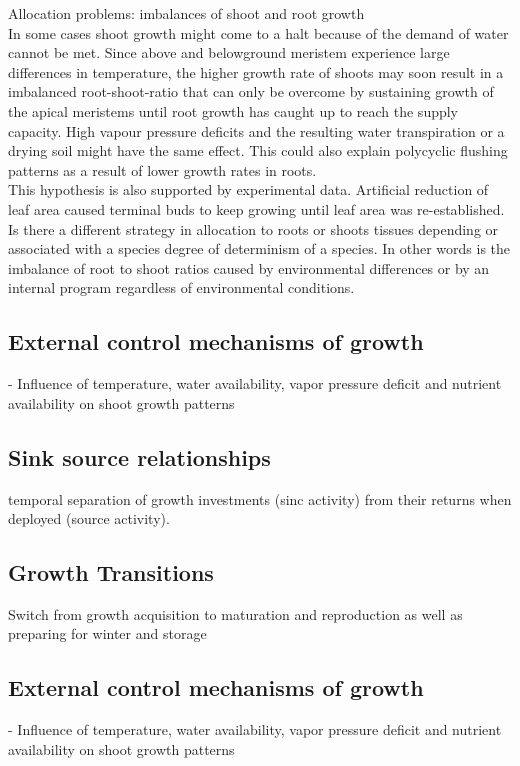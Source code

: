 \documentclass{article}
\begin{document}
Allocation problems: imbalances of shoot and root growth\\
In some cases shoot growth might come to a halt because of the demand of water cannot be met. Since above and belowground meristem experience large differences in temperature, the higher growth rate of shoots may soon result in a imbalanced root-shoot-ratio that can only be overcome by sustaining growth of the apical meristems until root growth has caught up to reach the supply capacity. High vapour pressure deficits and the resulting water transpiration or a drying soil might have the same effect. This could also explain polycyclic flushing patterns as a result of lower growth rates in roots.\\
This hypothesis is also supported by experimental data. Artificial reduction of leaf area caused terminal buds to keep growing until leaf area was re-established.
Is there a different strategy in allocation to roots or shoots tissues depending or associated with a species degree of determinism of a species. In other words is the imbalance of root to shoot ratios caused by environmental differences or by an internal program regardless of environmental conditions. \\


\subsection*{External control mechanisms of growth}
- Influence of temperature, water availability, vapor pressure deficit and nutrient availability on shoot growth patterns\\

\subsection*{Sink source relationships}
temporal separation of growth investments (sinc activity) from their returns when deployed (source activity). \\

\subsection*{Growth Transitions}
Switch from growth acquisition to maturation and reproduction as well as preparing for winter and storage\\


\subsection*{External control mechanisms of growth}
- Influence of temperature, water availability, vapor pressure deficit and nutrient availability on shoot growth patterns\\
\end{document}
